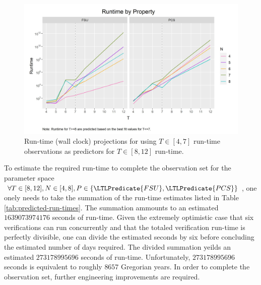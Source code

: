 \begin{figure}[ht!]
\centering
\caption[Runtime projections for ]{%
\label{fig:runtime-projections}%
Run-time (wall clock) projections for  using $T \in [4, 7]$ run-time observations as predictors for $T \in [8, 12]$ run-time.
}%
\includegraphics[width=\textwidth]{./figures/fsu-pcs-runtime-combined-preidcted.png}
\end{figure}

To estimate the required run-time to complete the observation set for the parameter space \(\forall T \in [8, 12], N \in [4, 8], P \in \{ \LTLPredicate{FSU}, \LTLPredicate{PCS} \}\), one onely needs to take the summation of the run-time estimates listed in Table \ref{tab:predicted-run-times}.
The summation ammounts to an estimated \(1639073974176\) seconds of run-time.
Given the extremely optimistic case that six verifications can run concurrently and that the totaled verification run-time is perfectly divisible, one can divide the estimated seconds by six before concluding the estimated number of days required.
The divided summation yeilds an estimated \(273178995696\) seconds of run-time.
Unfortunately, \(273178995696\) seconds is equivalent to roughly \(8657\) Gregorian years.
In order to complete the observation set, further engineering improvements are required.


